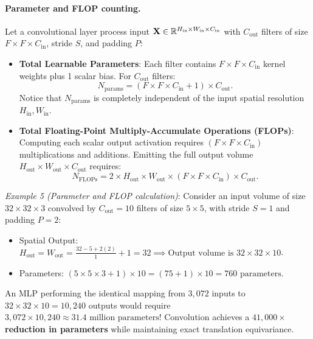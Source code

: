 \paragraph{Parameter and FLOP counting.}
Let a convolutional layer process input $\mathbf{X} \in \mathbb{R}^{H_{\text{in}} \times W_{\text{in}} \times C_{\text{in}}}$ with $C_{\text{out}}$ filters of size $F \times F \times C_{\text{in}}$, stride $S$, and padding $P$:
\begin{itemize}[leftmargin=*]
  \item \textbf{Total Learnable Parameters}: Each filter contains $F \times F \times C_{\text{in}}$ kernel weights plus 1 scalar bias. For $C_{\text{out}}$ filters:
    \begin{equation}
    N_{\text{params}} = \left( F \times F \times C_{\text{in}} + 1 \right) \times C_{\text{out}}.
    \label{eq:conv_param_count}
    \end{equation}
    Notice that $N_{\text{params}}$ is completely independent of the input spatial resolution $H_{\text{in}}, W_{\text{in}}$.
  \item \textbf{Total Floating-Point Multiply-Accumulate Operations (FLOPs)}: Computing each scalar output activation requires $(F \times F \times C_{\text{in}})$ multiplications and additions. Emitting the full output volume $H_{\text{out}} \times W_{\text{out}} \times C_{\text{out}}$ requires:
    \begin{equation}
    N_{\text{FLOPs}} = 2 \times H_{\text{out}} \times W_{\text{out}} \times \left( F \times F \times C_{\text{in}} \right) \times C_{\text{out}}.
    \label{eq:conv_flops_count}
    \end{equation}
\end{itemize}

\noindent\textit{Example 5 (Parameter and FLOP calculation)}: Consider an input volume of size $32 \times 32 \times 3$ convolved by $C_{\text{out}} = 10$ filters of size $5 \times 5$, with stride $S = 1$ and padding $P = 2$:
\begin{itemize}[noitemsep]
  \item Spatial Output: $H_{\text{out}} = W_{\text{out}} = \frac{32 - 5 + 2(2)}{1} + 1 = 32 \implies \text{Output volume is } 32 \times 32 \times 10$.
  \item Parameters: $(5 \times 5 \times 3 + 1) \times 10 = (75 + 1) \times 10 = 760 \text{ parameters}$.
\end{itemize}
An MLP performing the identical mapping from $3,072$ inputs to $32 \times 32 \times 10 = 10,240$ outputs would require $3,072 \times 10,240 \approx 31.4 \text{ million parameters}$! Convolution achieves a \textbf{$41,000\times$ reduction in parameters} while maintaining exact translation equivariance.

